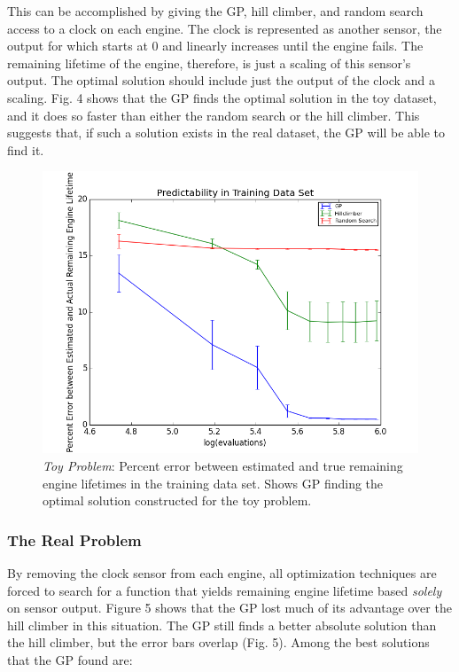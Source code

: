 \documentclass{acm_proc_article-sp}
\begin{document}
This can be accomplished by giving the GP, hill climber, and random search access to a clock on each engine. The clock is represented as another sensor, the output for which starts at 0 and linearly increases until the engine fails. The remaining lifetime of the engine, therefore, is just a scaling of this sensor's output. The optimal solution should include just the output of the clock and a scaling. Fig. 4 shows that the GP finds the optimal solution in the toy dataset, and it does so faster than either the random search or the hill climber. This suggests that, if such a solution exists in the real dataset, the GP will be able to find it.

\begin{figure}[!h]
\center
\includegraphics[scale=0.45]{bigplot_one_slice.png}
\caption{{\it{Toy Problem}}: Percent error between estimated and true remaining engine lifetimes in the training data set. Shows GP finding the optimal solution constructed for the toy problem.}
\end{figure}


\subsubsection{The Real Problem}
By removing the clock sensor from each engine, all optimization techniques are forced to search for a function that yields remaining engine lifetime based {\it{solely}} on sensor output.  Figure 5 shows that the GP lost much of its advantage over the hill climber in this situation. The GP still finds a better absolute solution than the hill climber, but the error bars overlap (Fig. 5). Among the best solutions that the GP found are:
\end{document}
